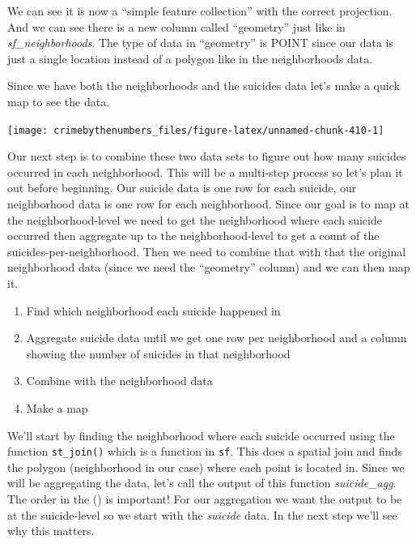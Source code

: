 \documentclass[
]{krantz}
\makeatletter
\newenvironment{Shaded}{\begin{snugshade}}{\end{snugshade}}
\newcommand{\AttributeTok}[1]{\textcolor[rgb]{0.61,0.61,0.61}{#1}}
\newcommand{\ConstantTok}[1]{\textcolor[rgb]{0,0,0}{#1}}
\newcommand{\FunctionTok}[1]{\textcolor[rgb]{0,0,0}{#1}}
\newcommand{\NormalTok}[1]{#1}
\newcommand{\SpecialCharTok}[1]{\textcolor[rgb]{0,0,0}{#1}}
\newcommand{\StringTok}[1]{\textcolor[rgb]{0.5,0.5,0.5}{#1}}
\providecommand{\tightlist}{%
  \setlength{\itemsep}{0pt}\setlength{\parskip}{0pt}}
\newenvironment{kframe}{%
\medskip{}
\setlength{\fboxsep}{.8em}
 \def\at@end@of@kframe{}%
 \ifinner\ifhmode%
  \def\at@end@of@kframe{\end{minipage}}%
  \begin{minipage}{\columnwidth}%
 \fi\fi%
 \def\FrameCommand##1{\hskip\@totalleftmargin \hskip-\fboxsep
 \colorbox{shadecolor}{##1}\hskip-\fboxsep
     \hskip-\linewidth \hskip-\@totalleftmargin \hskip\columnwidth}%
 \MakeFramed {\advance\hsize-\width
   \@totalleftmargin\z@ \linewidth\hsize
   \@setminipage}}%
 {\par\unskip\endMakeFramed%
 \at@end@of@kframe}
\renewenvironment{Shaded}{\begin{kframe}}{\end{kframe}}
\makeatother
\begin{document}
We can see it is now a ``simple feature collection'' with the correct projection. And we can see there is a new column called ``geometry'' just like in \emph{sf\_neighborhoods}. The type of data in ``geometry'' is POINT since our data is just a single location instead of a polygon like in the neighborhoods data.

Since we have both the neighborhoods and the suicides data let's make a quick map to see the data.

\begin{Shaded}
\end{Shaded}

\begin{center}\texttt{[image: crimebythenumbers\_files/figure-latex/unnamed-chunk-410-1]} \end{center}

Our next step is to combine these two data sets to figure out how many suicides occurred in each neighborhood. This will be a multi-step process so let's plan it out before beginning. Our suicide data is one row for each suicide, our neighborhood data is one row for each neighborhood. Since our goal is to map at the neighborhood-level we need to get the neighborhood where each suicide occurred then aggregate up to the neighborhood-level to get a count of the suicides-per-neighborhood. Then we need to combine that with that the original neighborhood data (since we need the ``geometry'' column) and we can then map it.

\begin{enumerate}
\def\labelenumi{\arabic{enumi}.}
\tightlist
\item
  Find which neighborhood each suicide happened in
\item
  Aggregate suicide data until we get one row per neighborhood and a column showing the number of suicides in that neighborhood
\item
  Combine with the neighborhood data
\item
  Make a map
\end{enumerate}

We'll start by finding the neighborhood where each suicide occurred using the function \texttt{st\_join()} which is a function in \texttt{sf}. This does a spatial join and finds the polygon (neighborhood in our case) where each point is located in. Since we will be aggregating the data, let's call the output of this function \emph{suicide\_agg}. The order in the () is important! For our aggregation we want the output to be at the suicide-level so we start with the \emph{suicide} data. In the next step we'll see why this matters.
\end{document}
